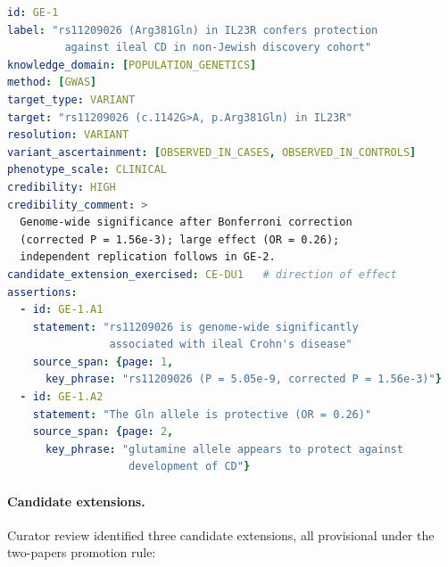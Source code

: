 \begin{lstlisting}[language=yaml]
id: GE-1
label: "rs11209026 (Arg381Gln) in IL23R confers protection
         against ileal CD in non-Jewish discovery cohort"
knowledge_domain: [POPULATION_GENETICS]
method: [GWAS]
target_type: VARIANT
target: "rs11209026 (c.1142G>A, p.Arg381Gln) in IL23R"
resolution: VARIANT
variant_ascertainment: [OBSERVED_IN_CASES, OBSERVED_IN_CONTROLS]
phenotype_scale: CLINICAL
credibility: HIGH
credibility_comment: >
  Genome-wide significance after Bonferroni correction
  (corrected P = 1.56e-3); large effect (OR = 0.26);
  independent replication follows in GE-2.
candidate_extension_exercised: CE-DU1   # direction of effect
assertions:
  - id: GE-1.A1
    statement: "rs11209026 is genome-wide significantly
                associated with ileal Crohn's disease"
    source_span: {page: 1,
      key_phrase: "rs11209026 (P = 5.05e-9, corrected P = 1.56e-3)"}
  - id: GE-1.A2
    statement: "The Gln allele is protective (OR = 0.26)"
    source_span: {page: 2,
      key_phrase: "glutamine allele appears to protect against
                   development of CD"}
\end{lstlisting}

\paragraph{Candidate extensions.} Curator review identified three candidate
extensions, all provisional under the two-papers promotion rule:

